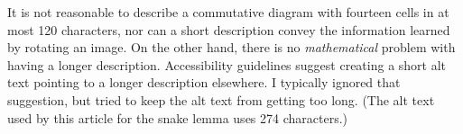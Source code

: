 \documentclass{ltugboat}
\begin{document}
It is not reasonable to describe a commutative diagram with fourteen cells
in at most 120 characters, nor can a short description convey the information
learned by rotating an image.
%
%
On the other hand, there is no \emph{mathematical} problem with
having a longer description.
Accessibility guidelines suggest creating a short alt text pointing
to a longer description elsewhere.
I typically ignored that suggestion,
but tried to keep the alt text from getting too long.
(The alt text used by this article for the snake lemma uses 274 characters.)
\end{document}
